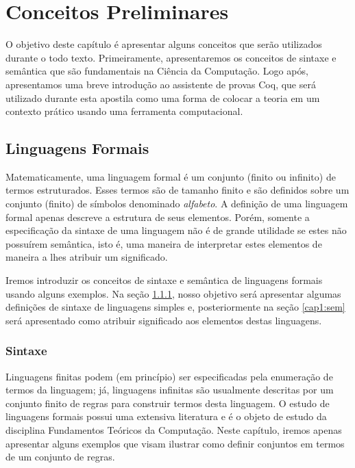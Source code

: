 \chapter{Conceitos Preliminares}

O objetivo deste cap\'itulo \'e apresentar alguns conceitos que ser\~ao utilizados durante o todo texto. Primeiramente,
apresentaremos os conceitos de sintaxe e sem\^antica que s\~ao fundamentais na Ci\^encia da Computa\c{c}\~ao. Logo ap\'os,
apresentamos uma breve introdu\c{c}\~ao ao assistente de provas Coq, que ser\'a utilizado durante esta apostila como uma
forma de colocar a teoria em um contexto pr\'atico usando uma ferramenta computacional.

\section{Linguagens Formais}

Matematicamente, uma linguagem formal \'e um conjunto (finito ou infinito) de termos estruturados. Esses
termos s\~ao de tamanho finito e s\~ao definidos sobre um conjunto (finito) de s\'imbolos denominado \textit{alfabeto}.
A defini\c{c}\~ao de uma linguagem formal apenas descreve a estrutura de seus elementos. Por\'em, somente a especifica\c{c}\~ao
da sintaxe de uma linguagem n\~ao \'e de grande utilidade se estes n\~ao possu\'irem sem\^antica, isto \'e, uma maneira de
interpretar estes elementos de maneira a lhes atribuir um significado. 

Iremos introduzir os conceitos de sintaxe e sem\^antica de linguagens formais usando alguns exemplos.
Na se\c{c}\~ao \ref{cap1:syn}, nosso objetivo ser\'a apresentar
algumas defini\c{c}\~oes de sintaxe de linguagens simples e, posteriormente na se\c{c}\~ao \ref{cap1:sem} ser\'a apresentado como
atribuir significado aos elementos destas linguagens.

\subsection{Sintaxe}\label{cap1:syn}

Linguagens finitas podem (em princ\'ipio) ser especificadas pela enumera\c{c}\~ao de termos da linguagem; j\'a, linguagens
infinitas s\~ao usualmente descritas por um conjunto finito de regras para construir termos desta linguagem.
O estudo de linguagens formais possui uma extensiva literatura e \'e o objeto de estudo da disciplina Fundamentos Te\'oricos da Computa\c{c}\~ao.
Neste cap\'itulo, iremos apenas apresentar alguns exemplos que visam ilustrar como definir conjuntos em termos de um conjunto de regras.

